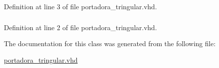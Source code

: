 Definition at line 3 of file portadora\+\_\+tringular.\+vhd.

\hypertarget{classportadora__tringular_a241c3e72dd8024cc8ae831b1b2aed7db}{}
\subsubsection[{S\+T\+D\+\_\+\+L\+O\+G\+I\+C\+\_\+\+U\+N\+S\+I\+G\+N\+E\+D}]{\hspace{0.3cm}{\ttfamily [Package]}}\label{classportadora__tringular_a241c3e72dd8024cc8ae831b1b2aed7db}


Definition at line 2 of file portadora\+\_\+tringular.\+vhd.



The documentation for this class was generated from the following file\+:\begin{DoxyCompactItemize}
\item 
\hyperlink{portadora__tringular_8vhd}{portadora\+\_\+tringular.\+vhd}\end{DoxyCompactItemize}
